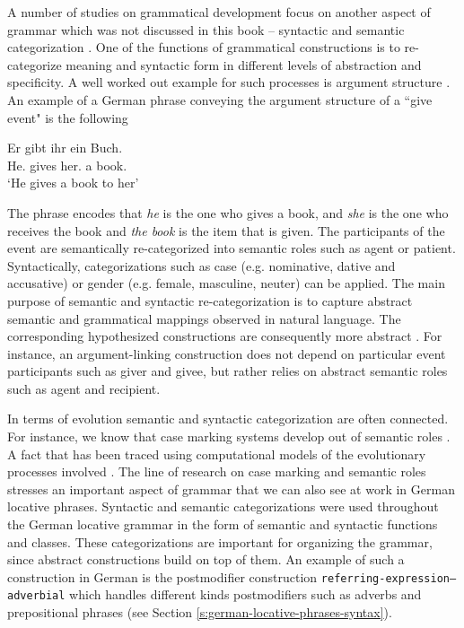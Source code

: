 A number of studies on grammatical development focus on another aspect
of grammar which was not discussed in this book -- syntactic and semantic categorization \citep{steels2011phrasal}.
One of the functions of grammatical constructions is to re-categorize meaning 
and syntactic form in different levels of abstraction and specificity. 
A well worked out example for such processes is argument structure 
\citep{steels2002case,steels2007multi-level,vantrijp2008phd}. 
An example of a German phrase conveying the argument structure of a ``give event"
is the following 
\begin{exe}
	\ex
\gll Er gibt ihr ein Buch.\\
{He.\NOM} gives {her.\DAT} a {book.\ACC}\\
\glt `He gives a book to her'
\end{exe}

The phrase encodes that \emph{he} is the one who gives a book, and \emph{she} is 
the one who receives the book and \emph{the book} is the item that is given. 
The participants of the event are semantically re-categorized into semantic roles 
such as agent or patient. Syntactically, categorizations such as case (e.g. 
nominative, dative and accusative) or gender (e.g. female, masculine, neuter)
can be applied. The main purpose of semantic and syntactic re-categorization 
is to capture abstract semantic and grammatical mappings observed in 
natural language. The corresponding hypothesized constructions 
are consequently more abstract \citep{steels2011phrasal}. For instance,
an argument-linking construction does not depend on particular event participants
such as giver and givee, but rather relies on abstract semantic roles such
as agent and recipient.

In terms of evolution semantic and syntactic categorization are often connected. 
For instance, we know that case marking systems develop out of 
semantic roles \citep{blake1994case}. A fact that has been traced using computational
models of the evolutionary processes involved \citep{vantrijp2008phd}.
The line of research on case marking and semantic roles 
\citep{steels2002case,vantrijp2008phd} stresses an important
aspect of grammar that we can also see at work in German locative phrases.
Syntactic and semantic categorizations were used throughout the 
German locative grammar in the form of semantic and syntactic functions
and classes. These categorizations are important for organizing the grammar,
since abstract constructions build on top of them. An example of such a construction
in German is the postmodifier construction 
{\footnotesize\tt referring-expression--adverbial} which handles different kinds postmodifiers 
such as adverbs and prepositional phrases (see Section \ref{s:german-locative-phrases-syntax}). 

